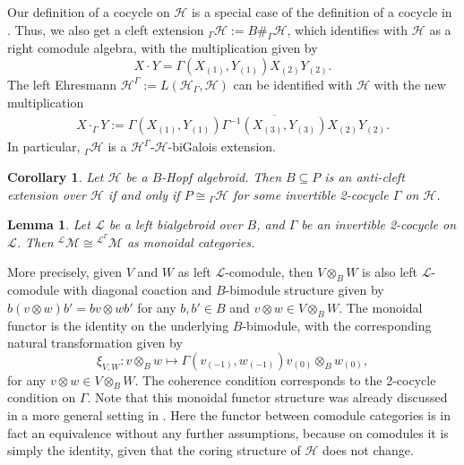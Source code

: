\documentclass[a4paper,reqno]{amsart}
\numberwithin{equation}{section}
\theoremstyle{plain}
\newtheorem{lem}[thm]{Lemma}
\newtheorem{cor}[thm]{Corollary}
\theoremstyle{remark}
\numberwithin{equation}{section}
\newcommand{\ot}{\otimes}
\newcommand{\cL}{\mathcal{L}}
\newcommand{\one}[1]{{#1}{}_{\scriptscriptstyle{(1)}}}
\newcommand{\two}[1]{{#1}{}_{\scriptscriptstyle{(2)}}}
\newcommand{\three}[1]{{#1}{}_{\scriptscriptstyle{(3)}}}
\newcommand{\z}{{}_{\scriptscriptstyle{(0)}}}
\renewcommand{\o}{{}_{\scriptscriptstyle{(1)}}}
\newcommand{\mo}{{}_{\scriptscriptstyle{(-1)}}}
\renewcommand{\t}{{}_{\scriptscriptstyle{(2)}}}
\newcommand{\CH}{\mathcal{H}}
\begin{document}
Our definition of a cocycle on $\CH$ is a special case of the definition of a cocycle in . Thus, we also get a cleft extension $_\Gamma\CH:=B\#_\Gamma \CH$, which identifies with $\CH$ as a right comodule algebra, with the multiplication given by 
\[X\cdot Y=\Gamma(X\o,Y\o)X\t Y\t.\]
The left Ehresmann $\CH^\Gamma:=L(\CH_\Gamma,\CH)$ can be identified with $\CH$ with the new multiplication
\begin{align}\label{twistprod}
    X\cdot_{\Gamma} Y:=\Gamma(\one{X}, \one{Y})\overline{\Gamma^{-1}(\three{X}, \three{Y})}\two{X}\two{Y}.
\end{align}
In particular, ${}_{\Gamma}\CH$ is a $\CH^{\Gamma}$-$\CH$-biGalois extension.

\begin{cor}\label{thm. one side twist is cleft extension}
  Let $\CH$ be a $B$-Hopf algebroid. Then $B\subseteq P$ is an anti-cleft extension over $\CH$ if and only if $P\cong {}_{\Gamma}\CH$ for some invertible 2-cocycle $\Gamma$ on $\CH$. 
\end{cor}











\begin{lem}
    Let $\cL$ be a left bialgebroid over $B$, and $\Gamma$ be an invertible  2-cocycle on $\cL$. Then  ${}^{\cL}\mathcal{M}\cong{}^{\cL^{\Gamma}}\mathcal{M}$ as monoidal categories.
\end{lem}


 More precisely,   given $V$ and $W$ as left $\cL$-comodule, then $V\ot_{B}{}W$ is also left $\cL$-comodule with diagonal coaction and $B$-bimodule structure given by $b(v\ot w)b'=bv\ot wb'$ for any $b,b'\in B$ and $v\ot w\in V\ot_{B}{}W$. The monoidal functor is the identity on the underlying $B$-bimodule, with the corresponding natural transformation given by
    \[\xi_{V, W}:v\ot_{B}{}w\mapsto \Gamma(v\mo, w\mo)v\z\ot_{B}{}w\z,\]
    for any $v\ot w\in V\ot_{B}{}W$. The coherence condition corresponds to the 2-cocycle condition on $\Gamma$. Note that this monoidal functor structure was already discussed in a more general setting in . Here the functor between comodule categories is in fact an equivalence without any further assumptions, because on comodules it is simply the identity, given that the coring structure of $\CH$ does not change.
\end{document}
